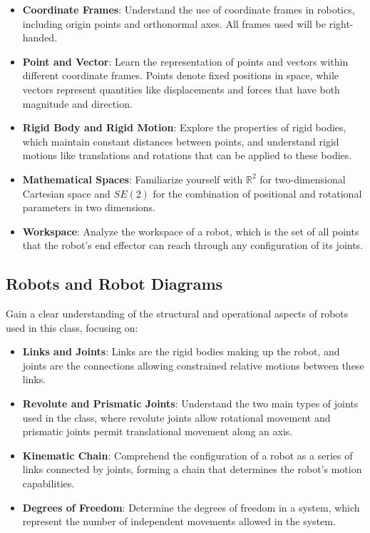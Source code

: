 \documentclass{16384_doc}
\begin{document}
\begin{itemize}
    \item \textbf{Coordinate Frames}:
    Understand the use of coordinate frames in robotics, including origin points and orthonormal axes. All frames used will be right-handed.
    
    \item \textbf{Point and Vector}:
    Learn the representation of points and vectors within different coordinate frames. Points denote fixed positions in space, while vectors represent quantities like displacements and forces that have both magnitude and direction.
    
    \item \textbf{Rigid Body and Rigid Motion}:
    Explore the properties of rigid bodies, which maintain constant distances between points, and understand rigid motions like translations and rotations that can be applied to these bodies.
    
    \item \textbf{Mathematical Spaces}:
    Familiarize yourself with $\mathbb{R}^2$ for two-dimensional Cartesian space and $SE(2)$ for the combination of positional and rotational parameters in two dimensions.
    
    \item \textbf{Workspace}:
    Analyze the workspace of a robot, which is the set of all points that the robot’s end effector can reach through any configuration of its joints.
\end{itemize}

\subsection{Robots and Robot Diagrams}

Gain a clear understanding of the structural and operational aspects of robots used in this class, focusing on:

\begin{itemize}
    \item \textbf{Links and Joints}: Links are the rigid bodies making up the robot, and joints are the connections allowing constrained relative motions between these links.
    
    \item \textbf{Revolute and Prismatic Joints}: Understand the two main types of joints used in the class, where revolute joints allow rotational movement and prismatic joints permit translational movement along an axis.
    
    \item \textbf{Kinematic Chain}: Comprehend the configuration of a robot as a series of links connected by joints, forming a chain that determines the robot’s motion capabilities.
    
    \item \textbf{Degrees of Freedom}: Determine the degrees of freedom in a system, which represent the number of independent movements allowed in the system.
\end{itemize}
\end{document}
